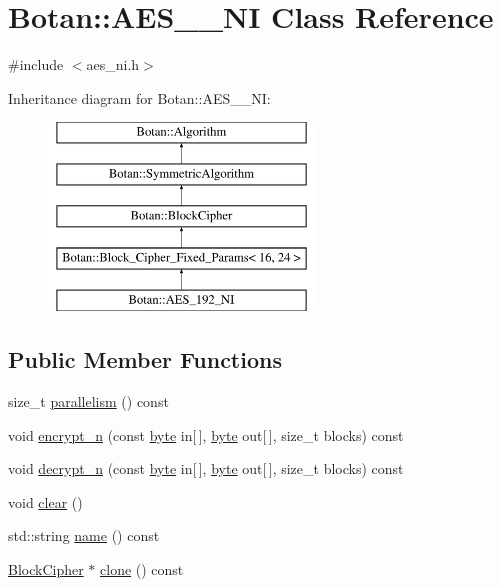\hypertarget{classBotan_1_1AES__192__NI}{\section{Botan\-:\-:A\-E\-S\-\_\-\_\-\-N\-I Class Reference}
\label{classBotan_1_1AES__192__NI}
}


{\ttfamily \#include $<$aes\-\_\-ni.\-h$>$}

Inheritance diagram for Botan\-:\-:A\-E\-S\-\_\-\_\-\-N\-I\-:\begin{figure}[H]
\begin{center}
\leavevmode
\includegraphics[height=5.000000cm]{classBotan_1_1AES__192__NI}
\end{center}
\end{figure}
\subsection*{Public Member Functions}
\begin{DoxyCompactItemize}
\item 
size\-\_\-t \hyperlink{classBotan_1_1AES__192__NI_afa36a09a188d5c222d8eecdfc3cb406a}{parallelism} () const 
\item 
void \hyperlink{classBotan_1_1AES__192__NI_a7311eb87fadc46f70f71eb89f8a0971e}{encrypt\-\_\-n} (const \hyperlink{namespaceBotan_a7d793989d801281df48c6b19616b8b84}{byte} in\mbox{[}$\,$\mbox{]}, \hyperlink{namespaceBotan_a7d793989d801281df48c6b19616b8b84}{byte} out\mbox{[}$\,$\mbox{]}, size\-\_\-t blocks) const 
\item 
void \hyperlink{classBotan_1_1AES__192__NI_adca9ad8f4f1b7e5d21470da377569113}{decrypt\-\_\-n} (const \hyperlink{namespaceBotan_a7d793989d801281df48c6b19616b8b84}{byte} in\mbox{[}$\,$\mbox{]}, \hyperlink{namespaceBotan_a7d793989d801281df48c6b19616b8b84}{byte} out\mbox{[}$\,$\mbox{]}, size\-\_\-t blocks) const 
\item 
void \hyperlink{classBotan_1_1AES__192__NI_ad7f3aa53c16c4e008ccd8da183c6d7fa}{clear} ()
\item 
std\-::string \hyperlink{classBotan_1_1AES__192__NI_a4bbcb5d572928b50369d1aa73c1feb74}{name} () const 
\item 
\hyperlink{classBotan_1_1BlockCipher}{Block\-Cipher} $\ast$ \hyperlink{classBotan_1_1AES__192__NI_a55cc29a341c7b4aeb2d6277984fe3072}{clone} () const 
\end{DoxyCompactItemize}
